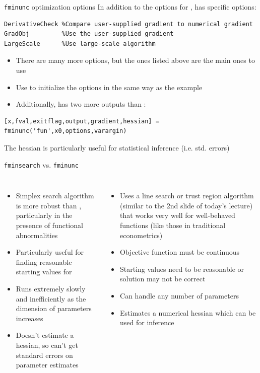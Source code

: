 \documentclass[english,xcolor=dvipsnames]{beamer}
\begin{document}
\begin{frame}[fragile]{\texttt{fminunc} optimization options}
In addition to the options for ,  has specific options:
\begin{lstlisting}
DerivativeCheck	%Compare user-supplied gradient to numerical gradient
GradObj         %Use the user-supplied gradient
LargeScale      %Use large-scale algorithm
\end{lstlisting}
\begin{itemize}
	\item There are many more options, but the ones listed above are the main ones to use
	\item Use  to initialize the options in the same way as the  example
	\item Additionally,  has two more outputs than :
\end{itemize}
\begin{lstlisting}
[x,fval,exitflag,output,gradient,hessian] = fminunc('fun',x0,options,varargin)
\end{lstlisting}
The hessian is particularly useful for statistical inference (i.e. std. errors)
\end{frame}

\begin{frame}[fragile]{\texttt{fminsearch} vs. \texttt{fminunc}}
\begin{columns}
\column{3in}
\begin{itemize}
	\item Simplex search algorithm is more robust than , particularly in the presence of functional abnormalities
	\item Particularly useful for finding reasonable starting values for 
	\item Runs extremely slowly and inefficiently as the dimension of parameters increases
	\item Doesn't estimate a hessian, so can't get standard errors on parameter estimates
\end{itemize}
\column{3in}
\begin{itemize}
	\item Uses a line search or trust region algorithm (similar to the 2nd slide of today's lecture) that works very well for well-behaved functions (like those in traditional econometrics)
	\item Objective function must be continuous
	\item Starting values need to be reasonable or solution may not be correct
	\item Can handle any number of parameters
	\item Estimates a numerical hessian which can be used for inference
\end{itemize}
\end{columns}
\end{frame}
\end{document}
